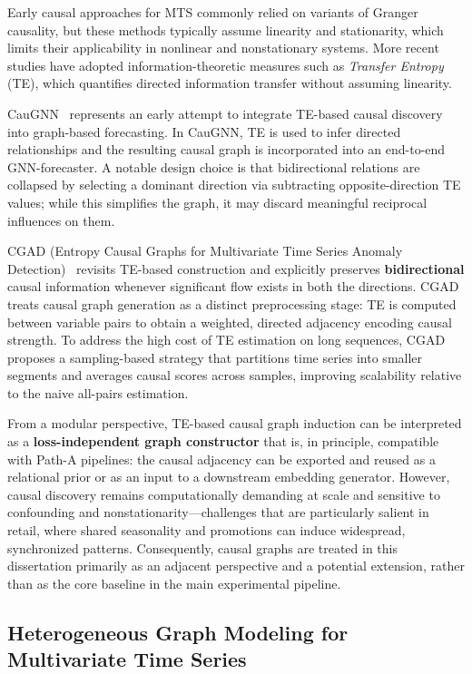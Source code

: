 Early causal approaches for MTS commonly relied on variants of Granger causality, but these methods typically assume
linearity and stationarity, which limits their applicability in nonlinear and nonstationary systems. More recent studies
have adopted information-theoretic measures such as \emph{Transfer Entropy} (TE), which quantifies directed
information transfer without assuming linearity.

CauGNN~\cite{duan2021caugnn} represents an early attempt to integrate TE-based causal discovery into graph-based
forecasting. In CauGNN, TE is used to infer directed relationships and the resulting causal graph is incorporated
into an end-to-end GNN-forecaster. A notable design choice is that bidirectional relations are collapsed by selecting
a dominant direction via subtracting opposite-direction TE values; while this simplifies the graph, it may discard
meaningful reciprocal influences on them.

CGAD (Entropy Causal Graphs for Multivariate Time Series Anomaly Detection)~\cite{febrinanto2025cgad} revisits
TE-based construction and explicitly preserves \textbf{bidirectional} causal information whenever significant flow
exists in both the directions. CGAD treats causal graph generation as a distinct preprocessing stage: TE is computed
between variable pairs to obtain a weighted, directed adjacency encoding causal strength. To address the high cost of
TE estimation on long sequences, CGAD proposes a sampling-based strategy that partitions time series into smaller
segments and averages causal scores across samples, improving scalability relative to the naive all-pairs estimation.

From a modular perspective, TE-based causal graph induction can be interpreted as a \textbf{loss-independent graph
constructor} that is, in principle, compatible with Path-A pipelines: the causal adjacency can be exported and reused
as a relational prior or as an input to a downstream embedding generator. However, causal discovery remains
computationally demanding at scale and sensitive to confounding and nonstationarity---challenges that are particularly
salient in retail, where shared seasonality and promotions can induce widespread, synchronized patterns. Consequently,
causal graphs are treated in this dissertation primarily as an adjacent perspective and a potential extension, rather
than as the core baseline in the main experimental pipeline.

\subsection{Heterogeneous Graph Modeling for Multivariate Time Series}
\label{sec:heterogeneous-graph-mts}

